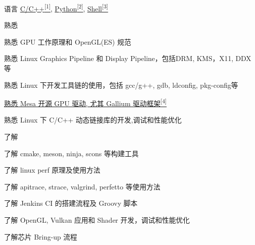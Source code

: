 
\begin{cvskills}
  \cvskill
    {语言} %
    {\hyperlink{cpp-proj}{C/C++\textsuperscript{[1]}}, \hyperlink{python-proj}{Python\textsuperscript{[2]}}, \hyperlink{shell-proj}{Shell\textsuperscript{[3]}}} %
\end{cvskills}

\begin{cventries}
  \cventry
    {} %
    {熟悉} %
    {} %
    {} %
    {
      \begin{cvitems} %
        \item {熟悉 GPU 工作原理和 OpenGL(ES) 规范}
        \item {熟悉 Linux Graphics Pipeline 和 Display Pipeline，包括DRM, KMS，X11, DDX等}
        \item {熟悉 Linux 下开发工具链的使用，包括 gcc/g++, gdb, ldconfig, pkg-config等}
        \item {\hyperlink{mesa-mr}{熟悉 Mesa 开源 GPU 驱动, 尤其 Gallium 驱动框架\textsuperscript{[4]}}}
        \item {熟悉 Linux 下 C/C++ 动态链接库的开发,调试和性能优化}
      \end{cvitems}
    }
  \cventry
    {} %
    {了解} %
    {} %
    {} %
    {
      \begin{cvitems} %
        \item {了解 cmake, meson, ninja, scons 等构建工具}
        \item {了解 linux perf 原理及使用方法}
        \item {了解 apitrace, strace, valgrind, perfetto 等使用方法}
        \item {了解 Jenkins CI 的搭建流程及 Groovy 脚本}
        \item {了解 OpenGL, Vulkan 应用和 Shader 开发，调试和性能优化}
        \item {了解芯片 Bring-up 流程}
      \end{cvitems}
    }
\end{cventries}
